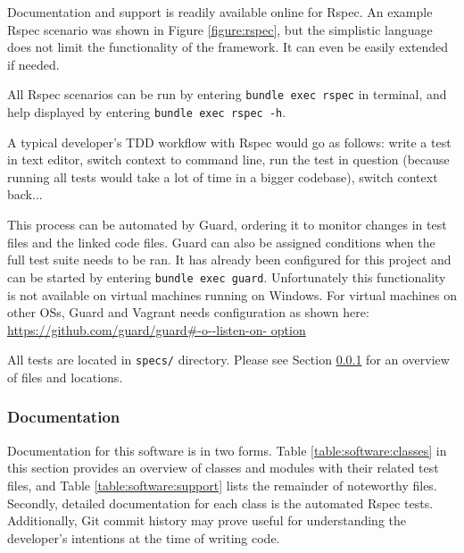 Documentation and support is readily available online for Rspec. An example
Rspec scenario was shown in Figure \ref{figure:rspec}, but the simplistic
language does not limit the functionality of the framework. It can even be
easily extended if needed.

All Rspec scenarios can be run by entering \texttt{bundle exec rspec} in
terminal, and help displayed by entering \texttt{bundle exec rspec -h}.

A typical developer's TDD workflow with Rspec would go as follows: write a test
in text editor, switch context to command line, run the test in question
(because running all tests would take a lot of time in a bigger codebase),
switch context back...

This process can be automated by Guard, ordering it to monitor changes in test
files and the linked code files. Guard can also be assigned conditions when the
full test suite needs to be ran. It has already been configured for this
project and can be started by entering \texttt{bundle exec guard}.
Unfortunately this functionality is not available on virtual machines running
on Windows. For virtual machines on other OSs, Guard and Vagrant needs
configuration as shown here: \url{https://github.com/guard/guard#-o--listen-on-
option}

All tests are located in \texttt{specs/} directory. Please see Section
\ref{sec:maintenance_manual:documentation} for an overview of files and
locations.


\subsubsection{Documentation}
\label{sec:maintenance_manual:documentation}

Documentation for this software is in two forms. Table
\ref{table:software:classes} in this section provides an overview of classes
and modules with their related test files, and Table
\ref{table:software:support} lists the remainder of noteworthy files. Secondly,
detailed documentation for each class is the automated Rspec tests.
Additionally, Git commit history may prove useful for understanding the
developer's intentions at the time of writing code.

